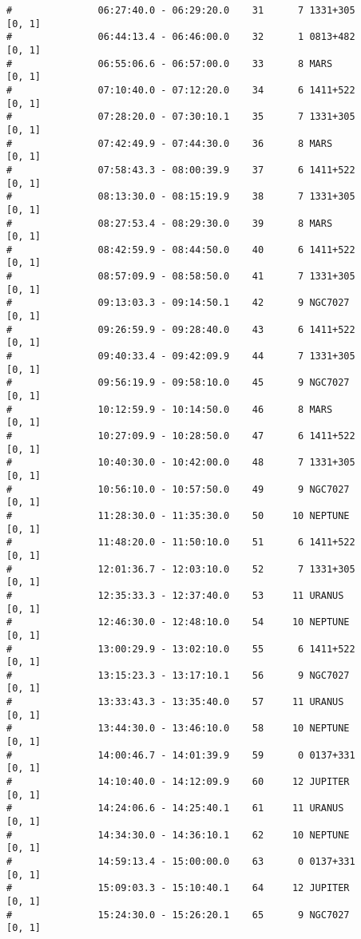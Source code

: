 \begin{verbatim}
#               06:27:40.0 - 06:29:20.0    31      7 1331+305       [0, 1]
#               06:44:13.4 - 06:46:00.0    32      1 0813+482       [0, 1]
#               06:55:06.6 - 06:57:00.0    33      8 MARS           [0, 1]
#               07:10:40.0 - 07:12:20.0    34      6 1411+522       [0, 1]
#               07:28:20.0 - 07:30:10.1    35      7 1331+305       [0, 1]
#               07:42:49.9 - 07:44:30.0    36      8 MARS           [0, 1]
#               07:58:43.3 - 08:00:39.9    37      6 1411+522       [0, 1]
#               08:13:30.0 - 08:15:19.9    38      7 1331+305       [0, 1]
#               08:27:53.4 - 08:29:30.0    39      8 MARS           [0, 1]
#               08:42:59.9 - 08:44:50.0    40      6 1411+522       [0, 1]
#               08:57:09.9 - 08:58:50.0    41      7 1331+305       [0, 1]
#               09:13:03.3 - 09:14:50.1    42      9 NGC7027        [0, 1]
#               09:26:59.9 - 09:28:40.0    43      6 1411+522       [0, 1]
#               09:40:33.4 - 09:42:09.9    44      7 1331+305       [0, 1]
#               09:56:19.9 - 09:58:10.0    45      9 NGC7027        [0, 1]
#               10:12:59.9 - 10:14:50.0    46      8 MARS           [0, 1]
#               10:27:09.9 - 10:28:50.0    47      6 1411+522       [0, 1]
#               10:40:30.0 - 10:42:00.0    48      7 1331+305       [0, 1]
#               10:56:10.0 - 10:57:50.0    49      9 NGC7027        [0, 1]
#               11:28:30.0 - 11:35:30.0    50     10 NEPTUNE        [0, 1]
#               11:48:20.0 - 11:50:10.0    51      6 1411+522       [0, 1]
#               12:01:36.7 - 12:03:10.0    52      7 1331+305       [0, 1]
#               12:35:33.3 - 12:37:40.0    53     11 URANUS         [0, 1]
#               12:46:30.0 - 12:48:10.0    54     10 NEPTUNE        [0, 1]
#               13:00:29.9 - 13:02:10.0    55      6 1411+522       [0, 1]
#               13:15:23.3 - 13:17:10.1    56      9 NGC7027        [0, 1]
#               13:33:43.3 - 13:35:40.0    57     11 URANUS         [0, 1]
#               13:44:30.0 - 13:46:10.0    58     10 NEPTUNE        [0, 1]
#               14:00:46.7 - 14:01:39.9    59      0 0137+331       [0, 1]
#               14:10:40.0 - 14:12:09.9    60     12 JUPITER        [0, 1]
#               14:24:06.6 - 14:25:40.1    61     11 URANUS         [0, 1]
#               14:34:30.0 - 14:36:10.1    62     10 NEPTUNE        [0, 1]
#               14:59:13.4 - 15:00:00.0    63      0 0137+331       [0, 1]
#               15:09:03.3 - 15:10:40.1    64     12 JUPITER        [0, 1]
#               15:24:30.0 - 15:26:20.1    65      9 NGC7027        [0, 1]

\end{verbatim}
